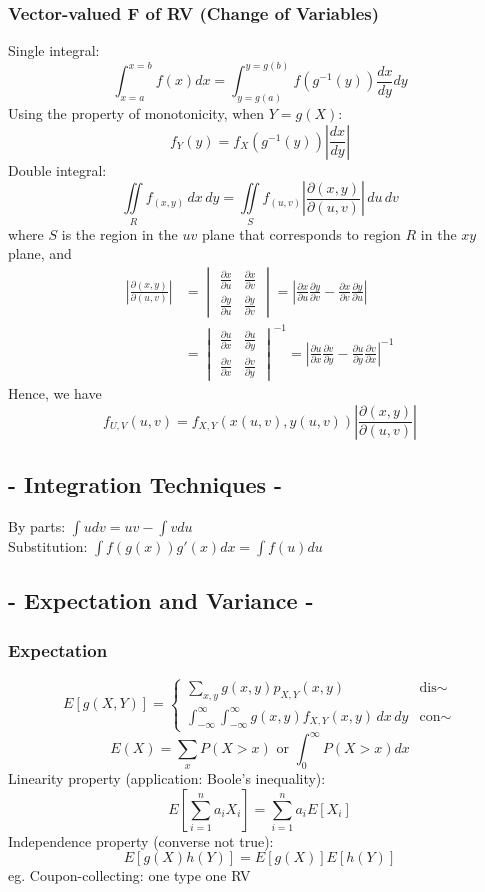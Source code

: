 \documentclass[a4paper,12pt]{article}
\begin{document}
\begin{multicols}{2}
\subsubsection*{Vector-valued F of RV (Change of Variables)} 
Single integral:
\[
\int_{x=a}^{x=b} f(x)dx = \int_{y=g(a)}^{y=g(b)} f(g^{-1}(y))\frac{dx}{dy}dy
\]
Using the property of monotonicity, when $Y = g(X)$:
\[
f_Y(y) = f_X(g^{-1}(y))|\frac{dx}{dy}|
\]
Double integral:
\[
\iint\limits_R f_(x,y) \, dx \, dy = \iint\limits_{S} f_(u,v) \left|\frac{\partial(x,y)}{\partial(u,v)}\right| \, du \, dv
\]
where $S$ is the region in the $uv$ plane that corresponds to region $R$ in the $xy$ plane, and 
\begin{align*}
\left|\frac{\partial(x,y)}{\partial(u,v)}\right| 
&= \begin{vmatrix}
\frac{\partial x}{\partial u} & \frac{\partial x}{\partial v} \\
\frac{\partial y}{\partial u} & \frac{\partial y}{\partial v}
\end{vmatrix} =
\left|\frac{\partial x}{\partial u}\frac{\partial y}{\partial v} - \frac{\partial x}{\partial v}\frac{\partial y}{\partial u}\right|\\
&= \begin{vmatrix}
\frac{\partial u}{\partial x} & \frac{\partial u}{\partial y} \\
\frac{\partial v}{\partial x} & \frac{\partial v}{\partial y}
\end{vmatrix}^{-1} =
\left|\frac{\partial u}{\partial x}\frac{\partial v}{\partial y} - \frac{\partial u}{\partial y}\frac{\partial v}{\partial x}\right|^{-1}
\end{align*}
Hence, we have
\[
f_{U,V}(u,v) = f_{X,Y}(x(u,v),y(u,v))\left|\frac{\partial(x,y)}{\partial(u,v)}\right|
\]

\subsection*{- Integration Techniques -}
By parts:
\(
\int u dv = uv - \int v du
\)\\
Substitution:
\(
\int f(g(x))g'(x)dx = \int f(u)du
\)


\newcolumn

\subsection*{- Expectation and Variance -}
\subsubsection*{Expectation}
\[
E[g(X,Y)] = \begin{cases}
\sum_{x,y}g(x,y)p_{X,Y}(x,y) & \text{dis}\sim \\
\int_{-\infty}^{\infty}\int_{-\infty}^{\infty}g(x,y)f_{X,Y}(x,y) \, dx \, dy & \text{con}\sim
\end{cases}
\]
$$E(X) = \sum_{x}P(X>x) \text{ or } \int_{0}^{\infty}P(X>x)dx$$
Linearity property (application: Boole's inequality):
\[
E\left[\sum_{i=1}^{n}a_iX_i\right] = \sum_{i=1}^{n}a_iE[X_i]
\]
Independence property (converse not true):
\[
E[g(X)h(Y)] = E[g(X)]E[h(Y)]
\]
eg. Coupon-collecting: one type one RV

\end{multicols}
\end{document}
